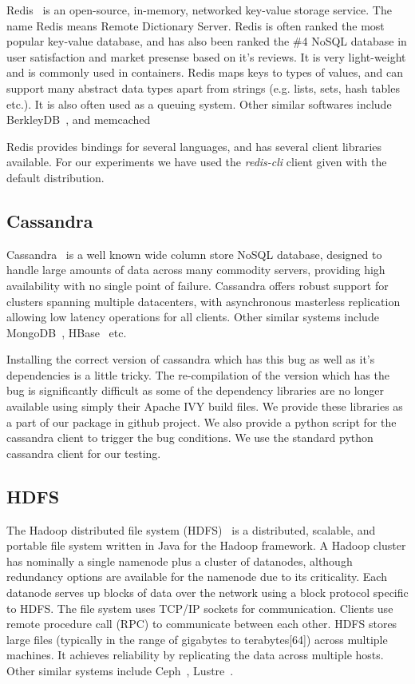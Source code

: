 Redis~\cite{redis} is an open-source, in-memory, networked key-value storage service. 
The name Redis means Remote Dictionary Server. 
Redis is often ranked the most popular key-value database, and has also been ranked the \#4 NoSQL database in user satisfaction and market presense based on it's reviews. 
It is very light-weight and is commonly used in containers.
Redis maps keys to types of values, and can support many abstract data types apart from strings (e.g. lists, sets, hash tables etc.).
It is also often used as a queuing system.
Other similar softwares include BerkleyDB~\cite{berkleyDB}, and memcached~\cite{memcached}

Redis provides bindings for several languages, and has several client libraries available. 
For our experiments we have used the \emph{redis-cli} client given with the default distribution.

\subsection{Cassandra}

Cassandra~\cite{cassandra} is a well known wide column store NoSQL database, designed to handle large amounts of data across many commodity servers, providing high availability with no single point of failure.
Cassandra offers robust support for clusters spanning multiple datacenters, with asynchronous masterless replication allowing low latency operations for all clients.
Other similar systems include MongoDB~\cite{mongodb}, HBase~\cite{hbase} etc.

Installing the correct version of cassandra which has this bug as well as it's dependencies is a little tricky. 
The re-compilation of the version which has the bug is significantly difficult as some of the dependency libraries are no longer available using simply their Apache IVY build files. We provide these libraries as a part of our package in github project. 
We also provide a python script for the cassandra client to trigger the bug conditions.
We use the standard python cassandra client for our testing.

\subsection{HDFS}

The Hadoop distributed file system (HDFS)~\cite{hdfs} is a distributed, scalable, and portable file system written in Java for the Hadoop framework.
A Hadoop cluster has nominally a single namenode plus a cluster of datanodes, although redundancy options are available for the namenode due to its criticality. 
Each datanode serves up blocks of data over the network using a block protocol specific to HDFS. The file system uses TCP/IP sockets for communication. Clients use remote procedure call (RPC) to communicate between each other.
HDFS stores large files (typically in the range of gigabytes to terabytes[64]) across multiple machines. It achieves reliability by replicating the data across multiple hosts.
Other similar systems include Ceph~\cite{ceph}, Lustre~\cite{Lustre}.

